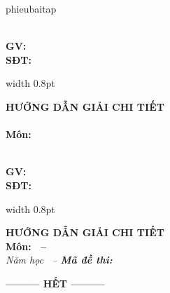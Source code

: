 \documentclass[11pt,a4paper]{article}
\begin{document}
\def\typept{phieubaitap}
\ifx\headertype\typept
\noindent
\begin{tcolorbox}[
    colback=blue!2!white,
    colframe=blue!80!black,
    arc=3mm,
    boxrule=1pt,
    left=6pt, right=6pt, top=6pt, bottom=6pt
]
\begin{minipage}[c]{0.43\linewidth}
\centering
{\large\bfseries\color{blue!85!black} \brandname}\\[3pt]
\textbf{GV: \giaovien}\\[2pt]
\textbf{SĐT: \sdt}
\end{minipage}%
\hfill
{\color{blue!60!black}\vrule width 0.8pt}%
\hfill
\begin{minipage}[c]{0.54\linewidth}
\centering
{\large\bfseries\color{red!85!black} HƯỚNG DẪN GIẢI CHI TIẾT}\\[2pt]
{\bfseries\color{red!85!black} \tenkythi}\\[2pt]
\textbf{Môn: \monhoc}
\end{minipage}
\end{tcolorbox}
\vspace{0.15cm}
\else
\noindent
\begin{tcolorbox}[
    colback=blue!2!white,
    colframe=blue!80!black,
    arc=3mm,
    boxrule=1pt,
    left=6pt, right=6pt, top=6pt, bottom=6pt
]
\begin{minipage}[c]{0.43\linewidth}
\centering
{\large\bfseries\color{blue!85!black} \brandname}\\[3pt]
\textbf{GV: \giaovien}\\[2pt]
\textbf{SĐT: \sdt}
\end{minipage}%
\hfill
{\color{blue!60!black}\vrule width 0.8pt}%
\hfill
\begin{minipage}[c]{0.54\linewidth}
\centering
{\large\bfseries\color{red!85!black} HƯỚNG DẪN GIẢI CHI TIẾT \tenkythi}\\[3pt]
\textbf{Môn: \monhoc\ifx\tentruong\empty\else\ -- \tentruong\fi}\\[2pt]
\textit{Năm học \namhoc\ -- \textbf{Mã đề thi: \made}}
\end{minipage}
\end{tcolorbox}
\vspace{0.15cm}
\fi



\ifdefined\inbangdapan
\inbangdapan
\fi

\vspace{0.4cm}
\begin{center}
	\textbf{--------- HẾT ---------}
\end{center}
\end{document}
